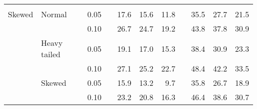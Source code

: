 \begin{table}[ht]
\begin{scriptsize}
\begin{center}
\begin{tabular}{ll p{.1cm} c p{.1cm} rrr p{.1cm} rrr}
&&&&&&&&&&&\\
Skewed       & Normal       && 0.05 &&   17.6 & 15.6 & 11.8 &   & 35.5 & 27.7 & 21.5 \\ 
             &              && 0.10 &&   26.7 & 24.7 & 19.2 &   & 43.8 & 37.8 & 30.9 \\ 
             & Heavy tailed && 0.05 &&   19.1 & 17.0 & 15.3 &   & 38.4 & 30.9 & 23.3 \\ 
             &              && 0.10 &&   27.1 & 25.2 & 22.7 &   & 48.4 & 42.2 & 33.5 \\ 
             & Skewed       && 0.05 &&   15.9 & 13.2 & 9.7 &   & 35.8 & 26.7 & 18.9 \\ 
             &              && 0.10 &&   23.2 & 20.8 & 16.3 &   & 46.4 & 38.6 & 30.7 \\ 


\end{tabular}
\end{center}
\end{scriptsize}
\end{table}

